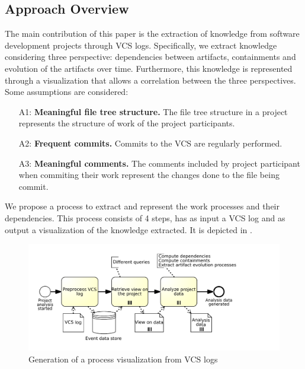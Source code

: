 \subsection{Approach Overview}


\label{subsec:proj-vis}
The main contribution of this paper is the extraction of knowledge from software development projects through VCS logs. Specifically, we extract knowledge considering three perspective: dependencies between artifacts, containments and evolution of the artifacts over time. Furthermore, this knowledge is represented through a visualization that allows a correlation between the three perspectives. Some assumptions are considered:
\begin{itemize}
\item [A1:] {\bf Meaningful file tree structure.} The file tree structure in a project represents the structure of work of the project participants.
\item [A2:] {\bf Frequent commits.} Commits to the VCS are regularly performed.  
\item [A3:] {\bf Meaningful comments.} The comments included by project participant when commiting their work represent the changes done to the file being commit.
\end{itemize}

We propose a process to extract and represent the work processes and their dependencies. This process consists of 4 steps, has as input a VCS log and as output a visualization of the knowledge extracted. It is depicted in . 

\begin{figure}[h]
\centering
\includegraphics[width=.7\textwidth]{figures/visualization-process}
\caption[Generation of a process visualization from VCS logs]{Generation of a process visualization from VCS logs}
\label{fig:visualization-process}
\end{figure}


